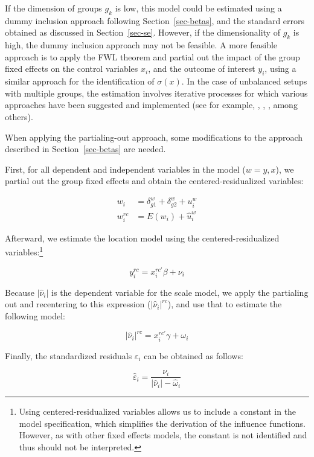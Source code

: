 \documentclass[
  authoryear,
  review,
  1p]{elsarticle}
\begin{document}
If the dimension of groups \(g_k\) is low, this model could be estimated
using a dummy inclusion approach following Section~\ref{sec-betas}, and
the standard errors obtained as discussed in Section~\ref{sec-se}.
However, if the dimensionality of \(g_k\) is high, the dummy inclusion
approach may not be feasible. A more feasible approach is to apply the
FWL theorem and partial out the impact of the group fixed effects on the
control variables \(x_{i}\), and the outcome of interest \(y_{i}\),
using a similar approach for the identification of \(\sigma(x)\). In the
case of unbalanced setups with multiple groups, the estimation involves
iterative processes for which various approaches have been suggested and
implemented (see for example, \citet{correia_feasible_nodate},
\citet{gaure2013}, \citet{rios2015}, among others).

When applying the partialing-out approach, some modifications to the
approach described in Section~\ref{sec-betas} are needed.

First, for all dependent and independent variables in the model
(\(w=y,x\)), we partial out the group fixed effects and obtain the
centered-residualized variables:

\[\begin{aligned}
w_{i} &= \delta_{g1}^w + \delta_{g2}^w + u_{i}^w \\
w_{i}^{rc} &= E(w_{i}) + \hat{u}_{i}^w
\end{aligned}
\]

Afterward, we estimate the location model using the
centered-residualized variables:\footnote{Using centered-residualized
  variables allows us to include a constant in the model specification,
  which simplifies the derivation of the influence functions. However,
  as with other fixed effects models, the constant is not identified and
  thus should not be interpreted.}

\[y_{i}^{rc} = x_{i}^{rc'} \beta + \nu_{i}
\]

Because \(|\hat \nu_i|\) is the dependent variable for the scale model,
we apply the partialing out and recentering to this expression
(\(|\hat \nu_i|^{rc}\)), and use that to estimate the following model:

\[|\hat\nu_{i}|^{rc} = x_{i}^{rc'} \gamma + \omega_{i}\]

Finally, the standardized residuals \(\varepsilon_i\) can be obtained as
follows:

\[\hat{\varepsilon}_{i} = \frac{\nu_{i}}{|\hat\nu_{i}|- \hat \omega_{i}}\]
\end{document}
